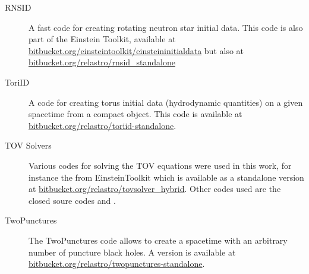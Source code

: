 \begin{fullwidth}
\begin{description}
	\item[RNSID] A fast code for creating rotating neutron star initial data.
	  This code is also part of the Einstein Toolkit,
	  available at
	  \href{https://bitbucket.org/einsteintoolkit/einsteininitialdata}{bitbucket.org/einsteintoolkit/einsteininitialdata}
      but also at 
	  \href{https://bitbucket.org/relastro/rnsid_standalone}{bitbucket.org/relastro/rnsid\_standalone}
	
	\item[ToriID] A code for creating torus initial data (hydrodynamic 
	  quantities) on a given spacetime from a compact object. This code
	  is available at
	  \href{https://bitbucket.org/relastro/toriid-standalone}{bitbucket.org/relastro/toriid-standalone}.
	
	\item[TOV Solvers] Various codes for solving the TOV equations were used
	  in this work, for instance the  from EinsteinToolkit
	  which is available as a standalone version at
	  \href{https://bitbucket.org/relastro/tovsolver_hybrid/}{bitbucket.org/relastro/tovsolver\_hybrid}.
	  Other codes used are the closed soure codes  and
	  .
	
	\item[TwoPunctures] The TwoPunctures code allows to create a spacetime
	  with an arbitrary number of puncture black holes. A version is available
	  at 
	  \href{https://bitbucket.org/relastro/twopunctures-standalone}{bitbucket.org/relastro/twopunctures-standalone}.
	
\end{description}


\end{fullwidth}
